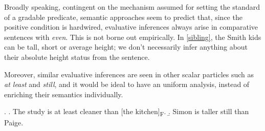 \documentclass[12pt,letterpaper]{scrartcl}
\newcommand{\alignright}{\hspace*{\fill}}
\newcommand{\infer}{$\rightsquigarrow$ }
\newcommand{\sub}[1]{\textsubscript{#1}}
\begin{document}
Broadly speaking, contingent on the mechanism assumed for setting the standard of a gradable predicate, semantic approaches seem to predict that, since the positive condition is hardwired, evaluative inferences always arise in comparative sentences with \textit{even}. This is not borne out empirically. In \ref{sibling}, the Smith kids can be tall, short or average height; we don't necessarily infer anything about their absolute height status from the sentence. 

Moreover, similar evaluative inferences are seen in other scalar particles such as \textit{at least} and \textit{still}, and it would be ideal to have an uniform analysis, instead of enriching their semantics individually.

\ex. \a. The study is at least cleaner than [the kitchen]\sub{F}. \alignright{[\infer Both rooms are dirty]}
\b. Simon is taller still than Paige. \alignright{[\infer Both Simon and Paige are tall]}






\end{document}
